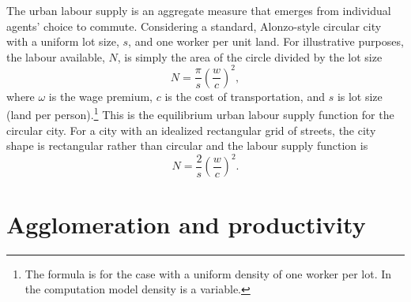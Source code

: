 The \gls{urban labour supply} is an \gls{aggregate} measure that emerges from individual agents' choice to commute. Considering a standard, Alonzo-style \gls{circular city} with a uniform lot size, $s$, and one worker per unit land. For illustrative purposes, the labour available, $N$, is simply the area of the circle divided by the lot size 
\begin{equation}
 N = \frac{\pi}{s} \left(\frac{w}{{c}}\right)^2,
\label{eqn-labour-supply1}
\end{equation}
where $\omega$ is the wage premium, $c$ is the cost of transportation, and $s$ is lot size (land per person).\footnote{The formula is for the case with a uniform density of one worker per lot. In the computation model density is a variable.} This is the equilibrium \gls{urban labour supply} function for the circular city. For a city with an idealized rectangular grid of streets, the city shape is rectangular rather than circular and the labour supply function is \[N= \frac{2}{s}\left(\frac{w}{{c}}\right)^2.\] %


\section{Agglomeration and productivity}\label{sec:Production-fn}



